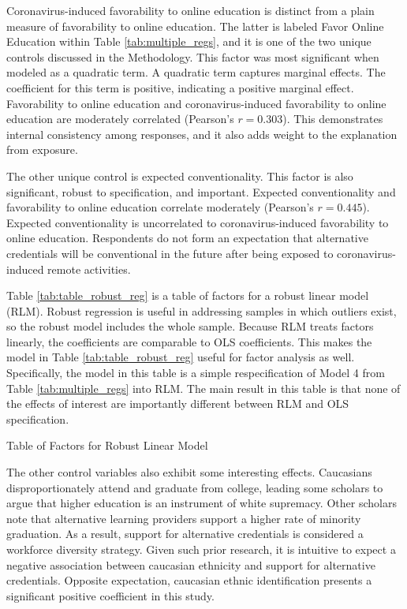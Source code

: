 \documentclass[review]{elsarticle}
\begin{document}
Coronavirus-induced favorability to online education is distinct from a plain measure of favorability to online education.
The latter is labeled Favor Online Education within Table \ref{tab:multiple_regs},
and it is one of the two unique controls discussed in the Methodology.
This factor was most significant when modeled as a quadratic term.
A quadratic term captures marginal effects.
The coefficient for this term is positive, indicating a positive marginal effect.
Favorability to online education
and coronavirus-induced favorability to online education are moderately correlated (Pearson's $r=0.303$).
This demonstrates internal consistency among responses,
and it also adds weight to the explanation from exposure.

The other unique control is expected conventionality.
This factor is also significant, robust to specification, and important.
Expected conventionality and favorability to online education correlate moderately (Pearson's $r=0.445$).
Expected conventionality is uncorrelated to coronavirus-induced favorability to online education.
Respondents do not form an expectation that alternative credentials will be conventional in the future
after being exposed to coronavirus-induced remote activities.

Table \ref{tab:table_robust_reg} is a table of factors for a robust linear model (RLM).
Robust regression is useful in addressing samples in which outliers exist, so the robust model includes the whole sample.
Because RLM treats factors linearly, the coefficients are comparable to OLS coefficients.
This makes the model in Table \ref{tab:table_robust_reg} useful for factor analysis as well.
Specifically, the model in this table is a simple respecification of Model 4 from Table \ref{tab:multiple_regs} into RLM.
The main result in this table is that none of the effects of interest are importantly different between RLM and OLS specification.

\begin{table}
    \caption{Table of Factors for Robust Linear Model}
    \resizebox{\columnwidth}{!}{
        
    }
    \label{tab:table_robust_reg}
\end{table}

The other control variables also exhibit some interesting effects.
Caucasians disproportionately attend and graduate from college,
leading some scholars to argue that higher education is an instrument of white supremacy\cite{hikido2016whitened, dennis2001skillful}.
Other scholars note that alternative learning providers support a higher rate of minority graduation.
As a result, support for alternative credentials is considered a workforce diversity strategy\cite{brown2017complex, jones2018alternative, rossiter2019designing}.
Given such prior research,
it is intuitive to expect a negative association between caucasian ethnicity and support for alternative credentials.
Opposite expectation, caucasian ethnic identification presents a significant positive coefficient in this study.
\end{document}

